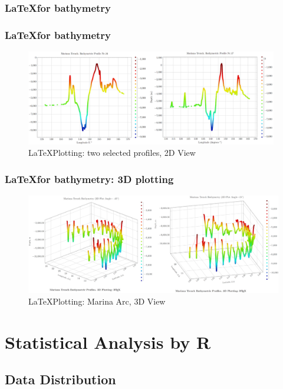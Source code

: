 \documentclass[pdflatex,compress,10pt,
	xcolor={dvipsnames,dvipsnames,svgnames,x11names,table},
	hyperref={colorlinks = true,breaklinks = true, urlcolor = NavyBlue, breaklinks = true}]{beamer}
\begin{document}
\begin{frame}\frametitle{\LaTeX \space for bathymetry}
\frametitle{\LaTeX \space for bathymetry}

\begin{figure}[H]
	\centering
		\includegraphics[width=11cm]{Fig-2-3.jpg}
	\caption{\LaTeX \space Plotting: two selected profiles, 2D View}\label{fig:2-3}
\end{figure}		
\end{frame}

\begin{frame}\frametitle{\LaTeX \space for bathymetry: 3D plotting}
\begin{figure}[H]
	\centering
		\includegraphics[width=11.5cm]{Fig-2-4.jpg}
	\caption{\LaTeX \space Plotting: Marina Arc, 3D View}\label{fig:2-4}
\end{figure}		
\end{frame}



\section{Statistical Analysis by R}
\subsection{Data Distribution}
\end{document}
